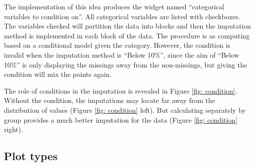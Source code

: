\documentclass[article]{jss}
\begin{document}
The implementation of this idea produces the widget named ``categorical variables to condition on''. All categorical variables are listed with checkboxes. The variables checked will partition the data into blocks and then the imputation method is implemented in each block of the data. The procedure is as computing based on a conditional model given the category. However, the condition is invalid when the imputation method is ``Below 10\%'', since the aim of ``Below 10\%'' is only displaying the missings away from the non-missings, but giving the condition will mix the points again.

The role of conditions in the imputation is revealed in Figure \ref{fig: condition}. Without the condition, the imputations may locate far away from the distribution of values (Figure \ref{fig: condition} left). But calculating separately by group provides a much better imputation for the data (Figure \ref{fig: condition} right).

\subsection{Plot types}
\end{document}
